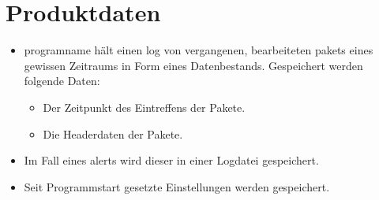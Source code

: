 \chapter{Produktdaten}


\begin{itemize}
  \item \gls{programname} hält einen \gls{log} von vergangenen, bearbeiteten \glspl{paket} eines gewissen Zeitraums in Form eines Datenbestands. Gespeichert werden folgende Daten:

  \begin{itemize}
    \item Der Zeitpunkt des Eintreffens der Pakete.
    \item Die Headerdaten der Pakete.
    \end{itemize}
  \item Im Fall eines \glspl{alert} wird dieser in einer Logdatei gespeichert.
  \item Seit Programmstart gesetzte Einstellungen werden gespeichert.
\end{itemize}